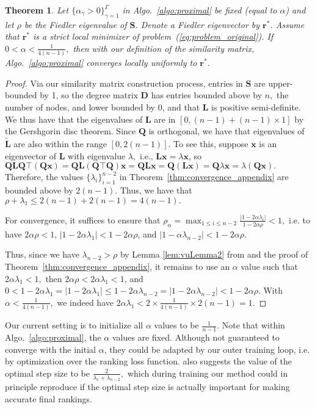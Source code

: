 \documentclass[nohyperref]{article}
\theoremstyle{plain}
\newtheorem{theorem}{Theorem}[section]
\theoremstyle{definition}
\theoremstyle{remark}
\begin{document}
\begin{theorem}
\label{thm:convergence_main_result_appendix}
Let $\{\alpha_\gamma>0\}_{\gamma=1}^\Gamma$ in Algo.~\ref{algo:proximal} be fixed (equal to $\alpha$) and let $\rho$ be the Fiedler eigenvalue of $\mathbf{S}$.  Denote a Fiedler eigenvector by $\mathbf{r}^*$. Assume that $\mathbf{r}^*$ is a strict local minimizer of problem~(\ref{eq:problem_original}).
If 
$0<\alpha<\frac{1}{4(n-1)},$ 
then with our definition of the similarity matrix,  Algo.~\ref{algo:proximal} converges locally uniformly to $\mathbf{r}^*$.
\end{theorem} 
\begin{proof}
Via our similarity matrix construction process, entries in $\mathbf{S}$ are upper-bounded by 1, so the degree matrix $\mathbf{D}$ has entries bounded above by $n,$ the number of nodes, and lower bounded by 0, and that $\mathbf{L}$ is positive semi-definite. We thus  have that the eigenvalues of $\mathbf{L}$ are in $[0,(n-1)+(n-1)\times 1]$ by the Gershgorin disc theorem.  Since $\mathbf{Q}$ is orthogonal, we have that eigenvalues of $\widetilde{\mathbf{L}}$ are also within the range $[0,2(n-1)].$ To see this, suppose $\mathbf{x}$ is an eigenvector of $\mathbf{L}$ with eigenvalue $\lambda,$ i.e., $\mathbf{Lx}=\lambda\mathbf{x}$, so $\mathbf{QLQ}\top(\mathbf{Qx})=\mathbf{QL}(\mathbf{Q}\top\mathbf{Q})\mathbf{x}=\mathbf{QL}\mathbf{x}=\mathbf{Q}(\mathbf{Lx})=\mathbf{Q}\lambda\mathbf{x}=\lambda(\mathbf{Qx}).$ Therefore, the values $\{\lambda_i\}_{i=1}^{n-2}$ in Theorem~\ref{thm:convergence_appendix} are bounded above by $2(n-1).$ 
Thus, we have that $\rho+\lambda_1\leq 2(n-1)+2(n-1)=4(n-1).$ 

For convergence,  it suffices to ensure that $\rho_\alpha=\max_{1\leq i \leq n-2}\frac{|1-2\alpha\lambda_i|}{1-2\alpha\rho}<1,$ i.e. to have $2\alpha\rho<1$, $|1-2\alpha\lambda_1|<1-2\alpha\rho$,  and $|1-\alpha\lambda_{n-2}|<1-2\alpha\rho$. 
 
Thus, since we have $\lambda_{n-2}>\rho$ by 
Lemma \ref{lem:vuLemma2} 
from  \cite{vu2019convergence} and the proof of Theorem~\ref{thm:convergence_appendix}, it remains to use an $\alpha$ value such that $2\alpha\lambda_{1}<1,$ then $2\alpha\rho<2\alpha\lambda_1<1$, and $0<1-2\alpha\lambda_1=|1-2\alpha\lambda_1|\leq 1-2\alpha\lambda_{n-2}=|1-2\alpha\lambda_{n-2}|< 1-2\alpha\rho.$ 
With $\alpha<\frac{1}{4(n-1)},$ we indeed have $2\alpha\lambda_{1}<2\times\frac{1}{4(n-1)}\times 2(n-1)=1.$
\end{proof}
 
Our current setting is to initialize all $\alpha$ values to be $\frac{1}{n-1}$. 
Note that within Algo.~\ref{algo:proximal}, the $\alpha$ values are fixed. Although not guaranteed to converge with the initial $\alpha$,   they could  be adapted by our outer training loop, i.e. by optimization over the ranking loss function. 
\cite{vu2019convergence} also suggests the value of the optimal step size to be $\frac{2}{\lambda_1+\lambda_{n-2}},$ which during training our method could in principle reproduce if the optimal step size is actually important for making accurate final rankings.
\end{document}
